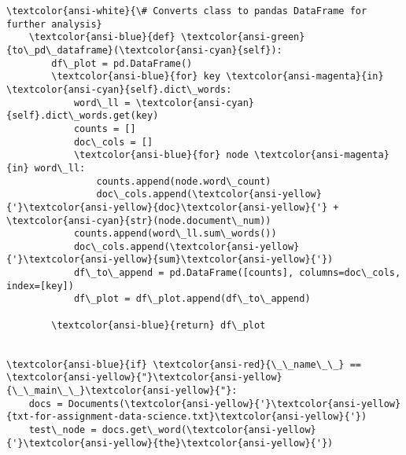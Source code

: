 \documentclass[11pt]{article}
\begin{document}
\begin{Verbatim}[commandchars=\\\{\}]
    \textcolor{ansi-white}{\# Converts class to pandas DataFrame for further analysis}
    \textcolor{ansi-blue}{def} \textcolor{ansi-green}{to\_pd\_dataframe}(\textcolor{ansi-cyan}{self}):
        df\_plot = pd.DataFrame()
        \textcolor{ansi-blue}{for} key \textcolor{ansi-magenta}{in} \textcolor{ansi-cyan}{self}.dict\_words:
            word\_ll = \textcolor{ansi-cyan}{self}.dict\_words.get(key)
            counts = []
            doc\_cols = []
            \textcolor{ansi-blue}{for} node \textcolor{ansi-magenta}{in} word\_ll:
                counts.append(node.word\_count)
                doc\_cols.append(\textcolor{ansi-yellow}{'}\textcolor{ansi-yellow}{doc}\textcolor{ansi-yellow}{'} + \textcolor{ansi-cyan}{str}(node.document\_num))
            counts.append(word\_ll.sum\_words())
            doc\_cols.append(\textcolor{ansi-yellow}{'}\textcolor{ansi-yellow}{sum}\textcolor{ansi-yellow}{'})
            df\_to\_append = pd.DataFrame([counts], columns=doc\_cols, index=[key])
            df\_plot = df\_plot.append(df\_to\_append)

        \textcolor{ansi-blue}{return} df\_plot


\textcolor{ansi-blue}{if} \textcolor{ansi-red}{\_\_name\_\_} == \textcolor{ansi-yellow}{"}\textcolor{ansi-yellow}{\_\_main\_\_}\textcolor{ansi-yellow}{"}:
    docs = Documents(\textcolor{ansi-yellow}{'}\textcolor{ansi-yellow}{txt-for-assignment-data-science.txt}\textcolor{ansi-yellow}{'})
    test\_node = docs.get\_word(\textcolor{ansi-yellow}{'}\textcolor{ansi-yellow}{the}\textcolor{ansi-yellow}{'})

    \end{Verbatim}


    
    
    
    
\end{document}
